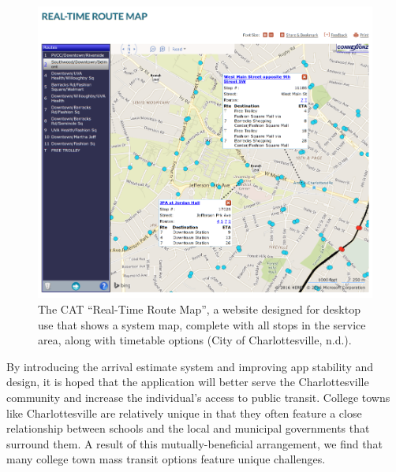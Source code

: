 \documentclass[12pt,letterpaper]{article}
\begin{document}
\begin{figure}[th!]
    \includegraphics[width=\textwidth]{CAT_online}
    \caption{
        \label{fig:cat_online}
        The CAT ``Real-Time Route Map'', a website designed for desktop
        use that shows a system map, complete with all stops in the service area, along with
        timetable options (City of Charlottesville, n.d.).
    }
\end{figure}

By introducing the arrival estimate system and improving app stability and
design, it is hoped that the application will better serve the
Charlottesville community and increase the individual's access to public
transit. College towns like Charlottesville are relatively unique in that they
often feature a close relationship between schools and the local and municipal
governments that surround them. A result of this mutually-beneficial
arrangement, we find that many college town mass transit options feature unique
challenges.
\end{document}
